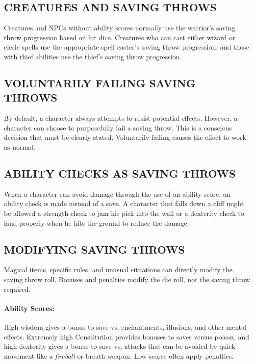 \begin{multicols}{2}
\subsection{CREATURES AND SAVING THROWS}

Creatures and NPCs without ability scores normally use the warrior's saving throw progression based on hit dice.  Creatures who can cast either wizard or cleric spells use the appropriate spell caster's saving throw progression, and those with thief abilities use the thief's saving throw progression.

\subsection{VOLUNTARILY FAILING SAVING THROWS}

By default, a character always attempts to resist potential effects. However, a character can choose to purposefully fail a saving throw.  This is a conscious decision that must be clearly stated.  Voluntarily failing causes the effect to work as normal.

\subsection{ABILITY CHECKS AS SAVING THROWS}

When a character can avoid damage through the use of an ability score, an ability check is made instead of a save.  A character that falls down a cliff might be allowed a strength check to jam his pick into the wall or a dexterity check to land properly when he hits the ground to reduce the damage.

\subsection{MODIFYING SAVING THROWS}

Magical items, specific rules, and unusual situations can directly modify the saving throw roll.  Bonuses and penalties modify the die roll, not the saving throw required.  

\paragraph{Ability Scores:} High wisdom gives a bonus to save vs. enchantments, illusions, and other mental effects.  Extremely high Constitution provides bonuses to saves versus poison, and high dexterity gives a bonus to save vs. attacks that can be avoided by quick movement like a \textit{fireball} or breath weapon.  Low scores often apply penalties.


\end{multicols}
